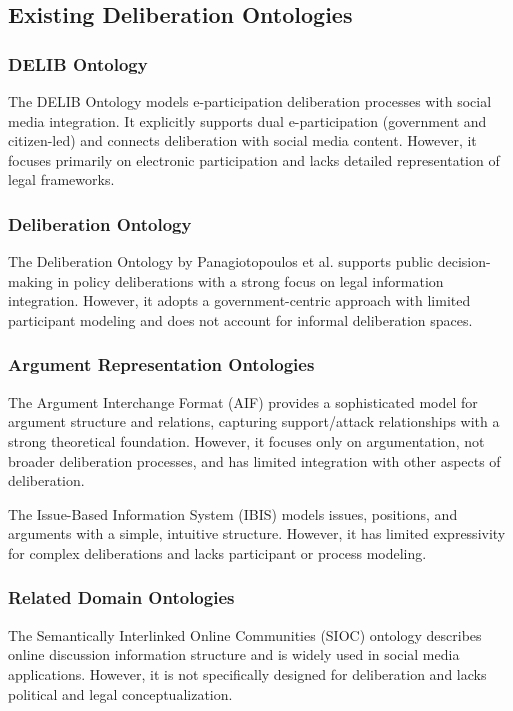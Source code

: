 \documentclass[runningheads]{llncs}  %
\begin{document}
\subsection{Existing Deliberation Ontologies}
\subsubsection{DELIB Ontology}
The DELIB Ontology \cite{porwol2014delib} models e-participation deliberation processes with social media integration. It explicitly supports dual e-participation (government and citizen-led) and connects deliberation with social media content. However, it focuses primarily on electronic participation and lacks detailed representation of legal frameworks.

\subsubsection{Deliberation Ontology}
The Deliberation Ontology by Panagiotopoulos et al. \cite{panagiotopoulos2011deliberation} supports public decision-making in policy deliberations with a strong focus on legal information integration. However, it adopts a government-centric approach with limited participant modeling and does not account for informal deliberation spaces.

\subsubsection{Argument Representation Ontologies}
The Argument Interchange Format (AIF) \cite{chesnevar2006aif} provides a sophisticated model for argument structure and relations, capturing support/attack relationships with a strong theoretical foundation. However, it focuses only on argumentation, not broader deliberation processes, and has limited integration with other aspects of deliberation.

The Issue-Based Information System (IBIS) \cite{kunz1970ibis} models issues, positions, and arguments with a simple, intuitive structure. However, it has limited expressivity for complex deliberations and lacks participant or process modeling.

\subsubsection{Related Domain Ontologies}
The Semantically Interlinked Online Communities (SIOC) ontology \cite{breslin2006sioc} describes online discussion information structure and is widely used in social media applications. However, it is not specifically designed for deliberation and lacks political and legal conceptualization.
\end{document}
